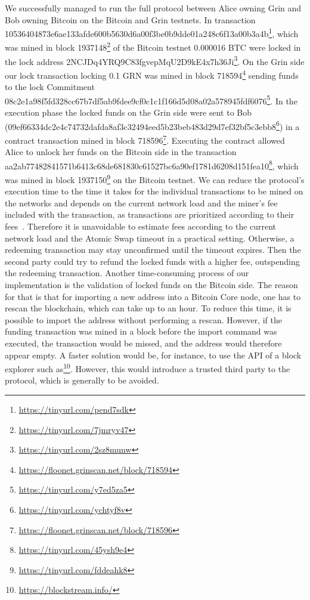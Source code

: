 We successfully managed to run the full protocol between Alice owning Grin and Bob owning Bitcoin on the Bitcoin and Grin testnets.
In transaction \\10536404873e6ae133afde600b5630d6a00f3be0b9dde01a248c6f13a00b3a4b\footnote{\url{https://tinyurl.com/pend7sdk}}, which was mined in block 1937148\footnote{\url{https://tinyurl.com/7jmryv47}} of the Bitcoin testnet 0.000016 BTC were locked in the lock address 2NCJDq4YRQ9C83fgvepMqU2D9kE4x7h36Ji\footnote{\url{https://tinyurl.com/2sz8munw}}.
On the Grin side our lock transaction locking 0.1 GRN was mined in block 718594\footnote{\url{https://floonet.grinscan.net/block/718594}} sending funds to the lock Commitment \\08c2e1a98f5fd328cc67b7df5ab9fdee9cf0c1c1f166d5d08a02a578945fdf6076\footnote{\url{https://tinyurl.com/y7ed5za5}}.
In the execution phase the locked funds on the Grin side were sent to Bob \\(09ef66334dc2e4c74732dafda8af3c32494eed5b23beb483d29d7ef32bf5c3ebb8\footnote{\url{https://tinyurl.com/ychtyf8v}}) in a contract transaction mined in block 718596\footnote{\url{https://floonet.grinscan.net/block/718596}}.
Executing the contract allowed Alice to unlock her funds on the Bitcoin side in the transaction \\ aa2ab77482841571b6413c68de681830c61527bc6a90ef1781d6208d151fea10\footnote{\url{https://tinyurl.com/45ysh9e4}}, which was mined in block 1937150\footnote{\url{https://tinyurl.com/fddeahk8}} on the Bitcoin testnet.
We can reduce the protocol's execution time to the time it takes for the individual transactions to be mined on the networks and depends on the current network load and the miner's fee included with the transaction, as transactions are prioritized according to their fees~\cite{kasahara2016effect}.
Therefore it is unavoidable to estimate fees according to the current network load and the Atomic Swap timeout in a practical setting.
Otherwise, a redeeming transaction may stay unconfirmed until the timeout expires.
Then the second party could try to refund the locked funds with a higher fee, outspending the redeeming transaction.
Another time-consuming process of our implementation is the validation of locked funds on the Bitcoin side.
The reason for that is that for importing a new address into a Bitcoin Core node, one has to rescan the blockchain, which can take up to an hour.
To reduce this time, it is possible to import the address without performing a rescan.
However, if the funding transaction was mined in a block before the import command was executed, the transaction would be missed, and the address would therefore appear empty.
A faster solution would be, for instance, to use the API of a block explorer such as\footnote{\url{https://blockstream.info/}}.
However, this would introduce a trusted third party to the protocol, which is generally to be avoided.

